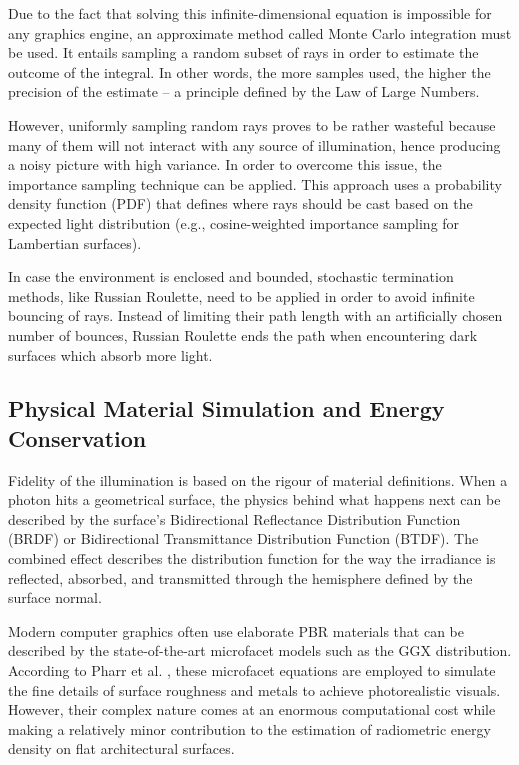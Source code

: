 Due to the fact that solving this infinite-dimensional equation is impossible for any graphics engine, an approximate method called Monte Carlo integration must be used. It entails sampling a random subset of rays in order to estimate the outcome of the integral. In other words, the more samples used, the higher the precision of the estimate – a principle defined by the Law of Large Numbers.

However, uniformly sampling random rays proves to be rather wasteful because many of them will not interact with any source of illumination, hence producing a noisy picture with high variance. In order to overcome this issue, the importance sampling technique can be applied. This approach uses a probability density function (PDF) that defines where rays should be cast based on the expected light distribution (e.g., cosine-weighted importance sampling for Lambertian surfaces).

In case the environment is enclosed and bounded, stochastic termination methods, like Russian Roulette, need to be applied in order to avoid infinite bouncing of rays. Instead of limiting their path length with an artificially chosen number of bounces, Russian Roulette ends the path when encountering dark surfaces which absorb more light.

\subsection{Physical Material Simulation and Energy Conservation}
Fidelity of the illumination is based on the rigour of material definitions. When a photon hits a geometrical surface, the physics behind what happens next can be described by the surface's Bidirectional Reflectance Distribution Function (BRDF) or Bidirectional Transmittance Distribution Function (BTDF). The combined effect describes the distribution function for the way the irradiance is reflected, absorbed, and transmitted through the hemisphere defined by the surface normal.

Modern computer graphics often use elaborate PBR materials that can be described by the state-of-the-art microfacet models such as the GGX distribution. According to Pharr et al. \cite{pharr2016physically}, these microfacet equations are employed to simulate the fine details of surface roughness and metals to achieve photorealistic visuals. However, their complex nature comes at an enormous computational cost while making a relatively minor contribution to the estimation of radiometric energy density on flat architectural surfaces.

